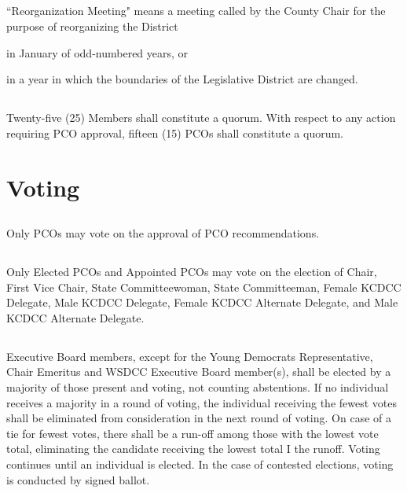\subsection{} \label{reorg-meeting}
``Reorganization Meeting" means a meeting called by the County Chair for the purpose of reorganizing the \fortythird{} District 
\begin{inlinealphalist}
    \item in January of odd-numbered years, or
    \item in a year in which the boundaries of the Legislative District are changed.
\end{inlinealphalist}

\subsection{}
Twenty-five (25) Members shall constitute a quorum. With respect to any action requiring PCO approval, fifteen (15) PCOs shall constitute a quorum.

\section{Voting}
\subsection{}
Only PCOs may vote on the approval of PCO recommendations.

\subsection{}
Only Elected PCOs and Appointed PCOs may vote on the election of Chair, First Vice Chair, State Committeewoman, State Committeeman, Female KCDCC Delegate, Male KCDCC Delegate, Female KCDCC Alternate Delegate, and Male KCDCC Alternate Delegate.

\subsection{}
Executive Board members, except for the Young Democrats Representative, Chair Emeritus and WSDCC Executive Board member(s), shall be elected by a majority of those present and voting, not counting abstentions. If no individual receives a majority in a round of voting, the individual receiving the fewest votes shall be eliminated from consideration in the next round of voting. On case of a tie for fewest votes, there shall be a run-off among those with the lowest vote total, eliminating the candidate receiving the lowest total I the runoff.  Voting continues until an individual is elected. In the case of contested elections, voting is conducted by signed ballot.

